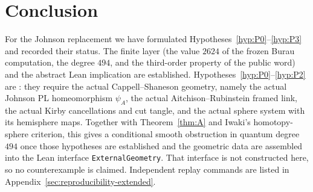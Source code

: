 \section{Conclusion}

For the Johnson replacement we have formulated
Hypotheses~\ref{hyp:P0}--\ref{hyp:P3} and recorded their status.  The
finite layer (the value $2624$ of the frozen Burau computation, the degree
$494$, and the third-order property of the public word) and the abstract
Lean implication are established.  Hypotheses~\ref{hyp:P0}--\ref{hyp:P2}
are \Open: they require the actual Cappell--Shaneson geometry, namely the
actual Johnson PL homeomorphism $\psi_A$, the actual Aitchison--Rubinstein
framed link, the actual Kirby cancellations and cut tangle, and the actual
sphere system with its hemisphere maps.  Together with Theorem~\ref{thm:A}
and Iwaki's homotopy-sphere criterion, this gives a conditional smooth
obstruction in quantum degree $494$ once those hypotheses are established
and the geometric data are assembled into the Lean interface
\texttt{ExternalGeometry}.  That interface is not constructed here, so no
counterexample is claimed.  Independent replay commands are listed in
Appendix~\ref{sec:reproducibility-extended}.
